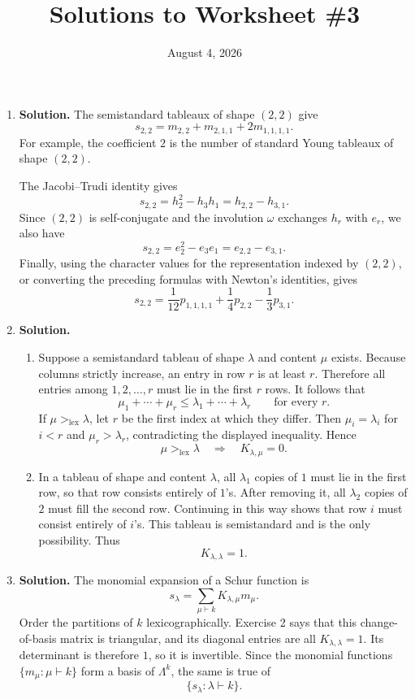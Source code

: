 \documentclass{article}
\title{Solutions to Worksheet \#3}
\author{}
\date{August 4, 2026}
\begin{document}
\maketitle
\begin{enumerate}
\item \textbf{Solution.}
The semistandard tableaux of shape $(2,2)$ give
\[
\boxed{s_{2,2}=m_{2,2}+m_{2,1,1}+2m_{1,1,1,1}.}
\]
For example, the coefficient $2$ is the number of standard Young
tableaux of shape $(2,2)$.

The Jacobi--Trudi identity gives
\[
\boxed{s_{2,2}=h_2^2-h_3h_1=h_{2,2}-h_{3,1}.}
\]
Since $(2,2)$ is self-conjugate and the involution $\omega$ exchanges
$h_r$ with $e_r$, we also have
\[
\boxed{s_{2,2}=e_2^2-e_3e_1=e_{2,2}-e_{3,1}.}
\]
Finally, using the character values for the representation indexed by
$(2,2)$, or converting the preceding formulas with Newton's
identities, gives
\[
\boxed{s_{2,2}
=\frac{1}{12}p_{1,1,1,1}
+\frac14p_{2,2}
-\frac13p_{3,1}.}
\]

\item \textbf{Solution.}
\begin{enumerate}
\item Suppose a semistandard tableau of shape $\lambda$ and content
$\mu$ exists.  Because columns strictly increase, an entry in row
$r$ is at least $r$.  Therefore all entries among
$1,2,\ldots,r$ must lie in the first $r$ rows.  It follows that
\[
\mu_1+\cdots+\mu_r\leq\lambda_1+\cdots+\lambda_r
\qquad\text{for every }r.
\]
If $\mu>_{\mathrm{lex}}\lambda$, let $r$ be the first index at which
they differ.  Then $\mu_i=\lambda_i$ for $i<r$ and
$\mu_r>\lambda_r$, contradicting the displayed inequality.  Hence
\[
\boxed{\mu>_{\mathrm{lex}}\lambda\quad\Longrightarrow\quad
K_{\lambda,\mu}=0.}
\]

\item In a tableau of shape and content $\lambda$, all $\lambda_1$
copies of $1$ must lie in the first row, so that row consists entirely
of $1$'s.  After removing it, all $\lambda_2$ copies of $2$ must fill
the second row.  Continuing in this way shows that row $i$ must
consist entirely of $i$'s.  This tableau is semistandard and is the
only possibility.  Thus
\[
\boxed{K_{\lambda,\lambda}=1.}
\]
\end{enumerate}

\item \textbf{Solution.}
The monomial expansion of a Schur function is
\[
s_\lambda=\sum_{\mu\vdash k}K_{\lambda,\mu}m_\mu.
\]
Order the partitions of $k$ lexicographically.  Exercise 2 says that
this change-of-basis matrix is triangular, and its diagonal entries
are all $K_{\lambda,\lambda}=1$.  Its determinant is therefore $1$,
so it is invertible.  Since the monomial functions
$\{m_\mu:\mu\vdash k\}$ form a basis of $\Lambda^k$, the same is true
of
\[
\boxed{\{s_\lambda:\lambda\vdash k\}.}
\]


\end{enumerate}
\end{document}
